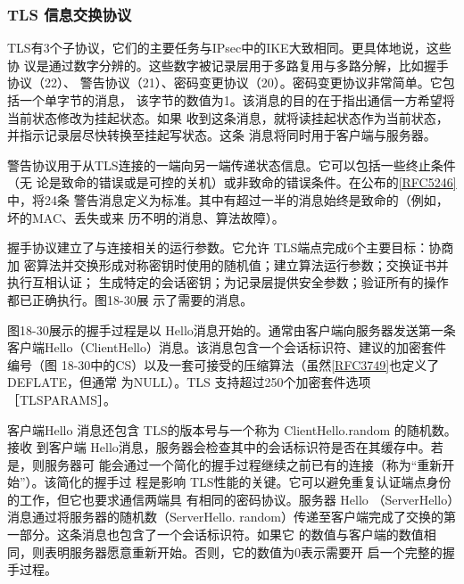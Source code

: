 \subsubsection{TLS 信息交换协议}
TLS有3个子协议，它们的主要任务与IPsec中的IKE大致相同。更具体地说，这些协
议是通过数字分辨的。这些数字被记录层用于多路复用与多路分解，比如握手协议（22）、
警告协议（21）、密码变更协议（20）。密码变更协议非常简单。它包括一个单字节的消息，
该字节的数值为1。该消息的目的在于指出通信一方希望将当前状态修改为挂起状态。如果
收到这条消息，就将读挂起状态作为当前状态，并指示记录层尽快转换至挂起写状态。这条
消息将同时用于客户端与服务器。

警告协议用于从TLS连接的一端向另一端传递状态信息。它可以包括一些终止条件（无
论是致命的错误或是可控的关机）或非致命的错误条件。在公布的\href{https://www.rfc-editor.org/rfc/rfc5246}{[RFC5246]}中，将24条
警告消息定义为标准。其中有超过一半的消息始终是致命的（例如，坏的MAC、丢失或来
历不明的消息、算法故障）。

握手协议建立了与连接相关的运行参数。它允许 TLS端点完成6个主要目标：协商加
密算法并交换形成对称密钥时使用的随机值；建立算法运行参数；交换证书并执行互相认证；
生成特定的会话密钥；为记录层提供安全参数；验证所有的操作都已正确执行。图18-30展
示了需要的消息。

图18-30展示的握手过程是以 Hello消息开始的。通常由客户端向服务器发送第一条
客户端Hello（ClientHello）消息。该消息包含一个会话标识符、建议的加密套件编号（图
18-30中的CS）以及一套可接受的压缩算法（虽然\href{https://www.rfc-editor.org/rfc/rfc3749}{[RFC3749]}也定义了 DEFLATE，但通常
为NULL）。TLS 支持超过250个加密套件选项 ［TLSPARAMS］。

客户端Hello 消息还包含 TLS的版本号与一个称为 ClientHello.random 的随机数。接收
到客户端 Hello消息，服务器会检查其中的会话标识符是否在其缓存中。若是，则服务器可
能会通过一个简化的握手过程继续之前已有的连接（称为“重新开始”）。该简化的握手过
程是影响 TLS性能的关键。它可以避免重复认证端点身份的工作，但它也要求通信两端具
有相同的密码协议。服务器 Hello （ServerHello）消息通过将服务器的随机数（ServerHello.
random）传递至客户端完成了交换的第一部分。这条消息也包含了一个会话标识符。如果它
的数值与客户端的数值相同，则表明服务器愿意重新开始。否则，它的数值为0表示需要开
启一个完整的握手过程。

